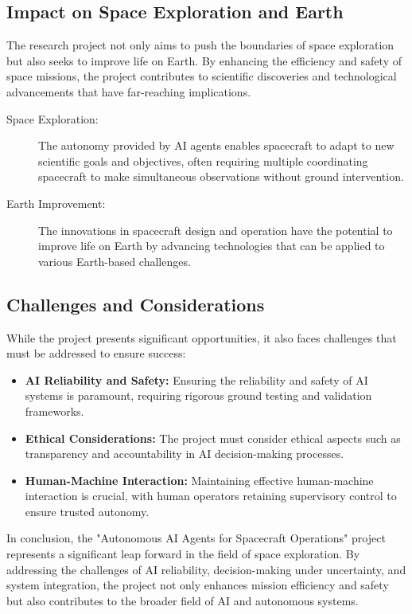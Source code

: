 \documentclass[a4paper,12pt]{article}
\begin{document}
\subsection{Impact on Space Exploration and Earth}

The research project not only aims to push the boundaries of space exploration but also seeks to improve life on Earth. By enhancing the efficiency and safety of space missions, the project contributes to scientific discoveries and technological advancements that have far-reaching implications.

\begin{description}
    \item[Space Exploration:] The autonomy provided by AI agents enables spacecraft to adapt to new scientific goals and objectives, often requiring multiple coordinating spacecraft to make simultaneous observations without ground intervention.
    \item[Earth Improvement:] The innovations in spacecraft design and operation have the potential to improve life on Earth by advancing technologies that can be applied to various Earth-based challenges.
\end{description}

\subsection{Challenges and Considerations}

While the project presents significant opportunities, it also faces challenges that must be addressed to ensure success:

\begin{itemize}
    \item \textbf{AI Reliability and Safety:} Ensuring the reliability and safety of AI systems is paramount, requiring rigorous ground testing and validation frameworks.
    \item \textbf{Ethical Considerations:} The project must consider ethical aspects such as transparency and accountability in AI decision-making processes.
    \item \textbf{Human-Machine Interaction:} Maintaining effective human-machine interaction is crucial, with human operators retaining supervisory control to ensure trusted autonomy.
\end{itemize}

In conclusion, the "Autonomous AI Agents for Spacecraft Operations" project represents a significant leap forward in the field of space exploration. By addressing the challenges of AI reliability, decision-making under uncertainty, and system integration, the project not only enhances mission efficiency and safety but also contributes to the broader field of AI and autonomous systems.
\end{document}
